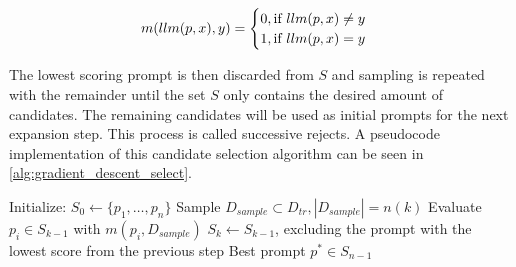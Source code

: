 \begin{equation}
    \label{eq:sample_binary_metric}
    m(llm(p, x), y) =
    \begin{cases}
        0, \text{if $llm(p, x) \neq y$}\\
        1, \text{if $llm(p, x) = y$}
    \end{cases}
\end{equation}

The lowest scoring prompt is then discarded from $S$ and sampling is repeated with the remainder until the set $S$ only contains the desired amount of candidates.
The remaining candidates will be used as initial prompts for the next expansion step.
This process is called successive rejects.
A pseudocode implementation of this candidate selection algorithm can be seen in \autoref{alg:gradient_descent_select}.


\begin{algorithm}
    \caption{}
    \label{alg:gradient_descent_select}
    \begin{algorithmic}[1]
        \State Initialize: $S_0 \gets \{p_1, \dots , p_n\}$
            \State Sample $D_{sample} \subset D_{tr}, |D_{sample}| = n(k)$
            \State Evaluate $p_i \in S_{k-1}$ with $m(p_i, D_{sample})$
            \State $S_k \gets S_{k-1}$, excluding the prompt with the lowest score from the previous step
        \EndFor
        \State \Return Best prompt $p^* \in S_{n-1}$
    \end{algorithmic}
\end{algorithm}